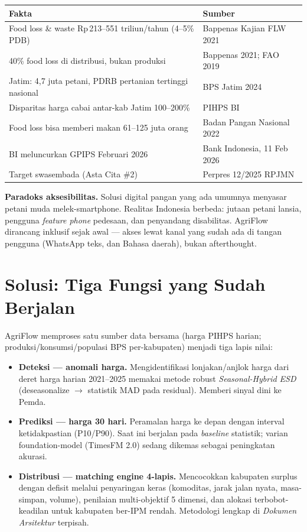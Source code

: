 \documentclass[11pt,a4paper]{article}
\newcommand{\rp}{Rp\,}
\begin{document}
\begin{center}
\begin{longtable}{p{9.5cm}p{5.5cm}}
\toprule
\textbf{Fakta} & \textbf{Sumber} \\
\midrule
\endhead
Food loss \& waste \rp 213--551 triliun/tahun (4--5\% PDB) & Bappenas Kajian FLW 2021 \\
40\% food loss di distribusi, bukan produksi & Bappenas 2021; FAO 2019 \\
Jatim: 4,7 juta petani, PDRB pertanian tertinggi nasional & BPS Jatim 2024 \\
Disparitas harga cabai antar-kab Jatim 100--200\% & PIHPS BI \\
Food loss bisa memberi makan 61--125 juta orang & Badan Pangan Nasional 2022 \\
BI meluncurkan GPIPS Februari 2026 & Bank Indonesia, 11 Feb 2026 \\
Target swasembada (Asta Cita \#2) & Perpres 12/2025 RPJMN \\
\bottomrule
\end{longtable}
\end{center}

\textbf{Paradoks aksesibilitas.} Solusi digital pangan yang ada umumnya menyasar petani muda
melek-smartphone. Realitas Indonesia berbeda: jutaan petani lansia, pengguna \emph{feature phone}
pedesaan, dan penyandang disabilitas. AgriFlow dirancang inklusif sejak awal --- akses lewat
kanal yang sudah ada di tangan pengguna (WhatsApp teks, dan Bahasa daerah), bukan afterthought.

\section{Solusi: Tiga Fungsi yang Sudah Berjalan}
AgriFlow memproses satu sumber data bersama (harga PIHPS harian; produksi/konsumsi/populasi BPS
per-kabupaten) menjadi tiga lapis nilai:

\begin{itemize}
  \item \textbf{Deteksi --- anomali harga.} Mengidentifikasi lonjakan/anjlok harga dari deret
        harga harian 2021--2025 memakai metode robust \emph{Seasonal-Hybrid ESD} (deseasonalize
        $\rightarrow$ statistik MAD pada residual). Memberi sinyal dini ke Pemda.
  \item \textbf{Prediksi --- harga 30 hari.} Peramalan harga ke depan dengan interval ketidakpastian
        (P10/P90). Saat ini berjalan pada \emph{baseline} statistik; varian foundation-model
        (TimesFM 2.0) sedang dikemas sebagai peningkatan akurasi.
  \item \textbf{Distribusi --- matching engine 4-lapis.} Mencocokkan kabupaten surplus dengan
        defisit melalui penyaringan keras (komoditas, jarak jalan nyata, masa-simpan, volume),
        penilaian multi-objektif 5 dimensi, dan alokasi terbobot-keadilan untuk kabupaten ber-IPM
        rendah. Metodologi lengkap di \emph{Dokumen Arsitektur} terpisah.
\end{itemize}
\end{document}
